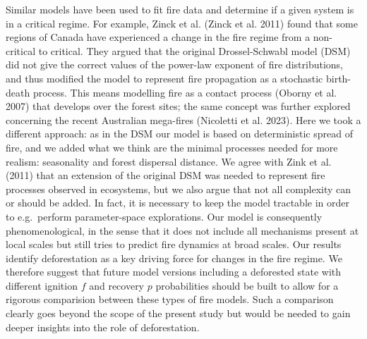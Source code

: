 \documentclass[
]{article}
\begin{document}
Similar models have been used to fit fire data and determine if a given
system is in a critical regime. For example, Zinck et al. (Zinck et al.
2011) found that some regions of Canada have experienced a change in the
fire regime from a non-critical to critical. They argued that the
original Drossel-Schwabl model (DSM) did not give the correct values of
the power-law exponent of fire distributions, and thus modified the
model to represent fire propagation as a stochastic birth-death process.
This means modelling fire as a contact process (Oborny et al. 2007) that
develops over the forest sites; the same concept was further explored
concerning the recent Australian mega-fires (Nicoletti et al. 2023).
Here we took a different approach: as in the DSM our model is based on
deterministic spread of fire, and we added what we think are the minimal
processes needed for more realism: seasonality and forest dispersal
distance. We agree with Zink et al. (2011) that an extension of the
original DSM was needed to represent fire processes observed in
ecosystems, but we also argue that not all complexity can or should be
added. In fact, it is necessary to keep the model tractable in order to
e.g.~perform parameter-space explorations. Our model is consequently
phenomenological, in the sense that it does not include all mechanisms
present at local scales but still tries to predict fire dynamics at
broad scales. Our results identify deforestation as a key driving force
for changes in the fire regime. We therefore suggest that future model
versions including a deforested state with different ignition \(f\) and
recovery \(p\) probabilities should be built to allow for a rigorous
comparision between these types of fire models. Such a comparison
clearly goes beyond the scope of the present study but would be needed
to gain deeper insights into the role of deforestation.
\end{document}
